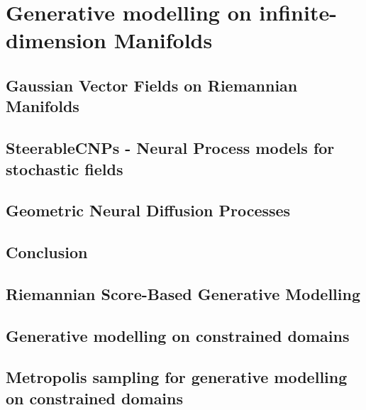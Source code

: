 \documentclass[11pt]{book}
\begin{document}
\part{Generative modelling on infinite-dimension Manifolds}

\chapter{Gaussian Vector Fields on Riemannian Manifolds}


\chapter{SteerableCNPs - Neural Process models for stochastic fields}


\chapter{Geometric Neural Diffusion Processes}


\chapter{Conclusion}

\newpage

\printbibliography

\appendix

\chapter{Riemannian Score-Based Generative Modelling}


\chapter{Generative modelling on constrained domains}


\chapter{Metropolis sampling for generative modelling on constrained domains}

\end{document}
